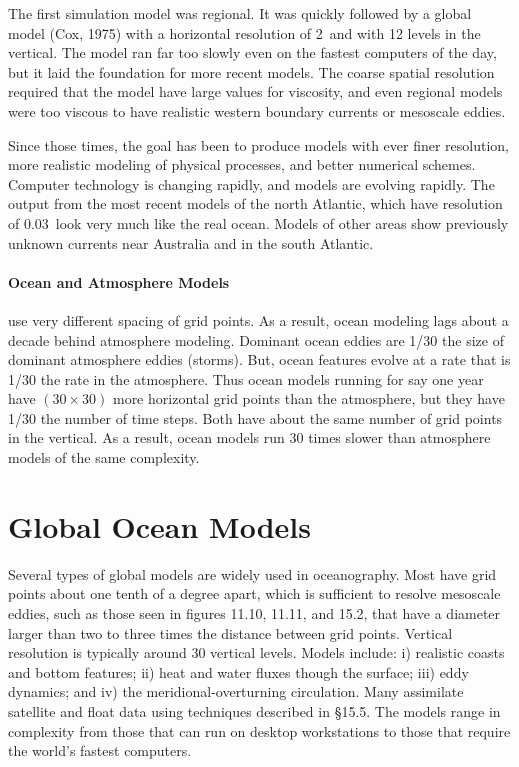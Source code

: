 The first simulation model was regional. It was quickly followed by a
global model (Cox, 1975) with a horizontal resolution of
2\degrees\ and with 12 levels in the vertical. The model ran far too
slowly even on the fastest computers of the day, but it laid the
foundation for more recent models. The coarse spatial resolution
required that the model have large values for viscosity, and even
regional models were too viscous to have realistic western boundary
currents or mesoscale eddies.

Since those times, the goal has been to produce models with ever finer
resolution, more realistic modeling of physical processes, and better
numerical schemes. Computer technology is changing rapidly, and models
are evolving rapidly. The output from the most recent models of the
north Atlantic, which have resolution of 0.03\degrees\ look very much
like the real ocean. Models of other areas show previously unknown
currents near Australia and in the south Atlantic.

\paragraph{Ocean and Atmosphere Models} use very different spacing of grid points.
As a result, ocean modeling lags about a decade behind atmosphere
modeling. Dominant ocean eddies are 1/30 the size of dominant
atmosphere eddies (storms). But, ocean features evolve at a rate that
is 1/30 the rate in the atmosphere. Thus ocean models running for say
one year have $(30 \times 30 )$ more horizontal grid points than the
atmosphere, but they have 1/30 the number of time steps. Both have
about the same number of grid points in the vertical. As a result,
ocean models run 30 times slower than atmosphere models of the same
complexity.

\section{Global Ocean Models}

Several types of global models are widely used in oceanography. Most
have grid points about one tenth of a degree apart, which is
sufficient to resolve mesoscale eddies, such
as those seen in figures 11.10, 11.11, and 15.2, that have a diameter
larger than two to three times the distance between grid
points. Vertical resolution is typically around 30 vertical
levels. Models include: i) realistic coasts and bottom features; ii)
heat and water fluxes though the surface; iii) eddy dynamics; and iv)
the meridional-overturning
circulation. Many assimilate satellite and float data using techniques
described in \S 15.5. The models range in complexity from those that
can run on desktop workstations to those that require the world's
fastest computers.

